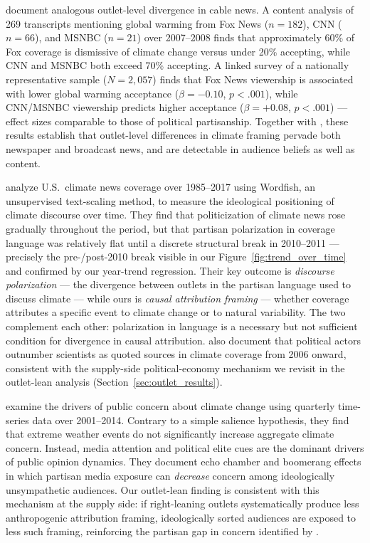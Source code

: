\documentclass[12pt]{article}
\begin{document}
\citet{feldman2012} document analogous outlet-level divergence in cable
news.  A content analysis of 269 transcripts mentioning global warming
from Fox News ($n=182$), CNN ($n=66$), and MSNBC ($n=21$) over 2007--2008
finds that approximately 60\% of Fox coverage is dismissive of climate
change versus under 20\% accepting, while CNN and MSNBC both exceed
70\% accepting.  A linked survey of a nationally representative sample
($N = 2{,}057$) finds that Fox News viewership is associated with lower
global warming acceptance ($\beta = -0.10$, $p<.001$), while CNN/MSNBC
viewership predicts higher acceptance ($\beta = +0.08$, $p<.001$) ---
effect sizes comparable to those of political partisanship.  Together
with \citet{feldman2017}, these results establish that outlet-level
differences in climate framing pervade both newspaper and broadcast
news, and are detectable in audience beliefs as well as content.

\citet{chinn2020} analyze U.S.\ climate news coverage over 1985--2017
using Wordfish, an unsupervised text-scaling method, to measure the
ideological positioning of climate discourse over time.  They find that
politicization of climate news rose gradually throughout the period,
but that partisan polarization in coverage language was relatively flat
until a discrete structural break in 2010--2011 --- precisely the
pre-/post-2010 break visible in our Figure~\ref{fig:trend_over_time}
and confirmed by our year-trend regression.  Their key outcome is
\emph{discourse polarization} --- the divergence between outlets in the
partisan language used to discuss climate --- while ours is \emph{causal
attribution framing} --- whether coverage attributes a specific event to
climate change or to natural variability.  The two complement each
other: polarization in language is a necessary but not sufficient
condition for divergence in causal attribution.  \citet{chinn2020} also
document that political actors outnumber scientists as quoted sources in
climate coverage from 2006 onward, consistent with the supply-side
political-economy mechanism we revisit in the outlet-lean analysis
(Section~\ref{sec:outlet_results}).

\citet{carmichael2017} examine the drivers of public concern about
climate change using quarterly time-series data over 2001--2014.
Contrary to a simple salience hypothesis, they find that extreme weather
events do not significantly increase aggregate climate concern.  Instead,
media attention and political elite cues are the dominant drivers of
public opinion dynamics.  They document echo chamber and boomerang
effects in which partisan media exposure can \emph{decrease} concern
among ideologically unsympathetic audiences.  Our outlet-lean finding is
consistent with this mechanism at the supply side: if right-leaning
outlets systematically produce less anthropogenic attribution framing,
ideologically sorted audiences are exposed to less such framing,
reinforcing the partisan gap in concern identified by
\citet{carmichael2017}.
\end{document}
